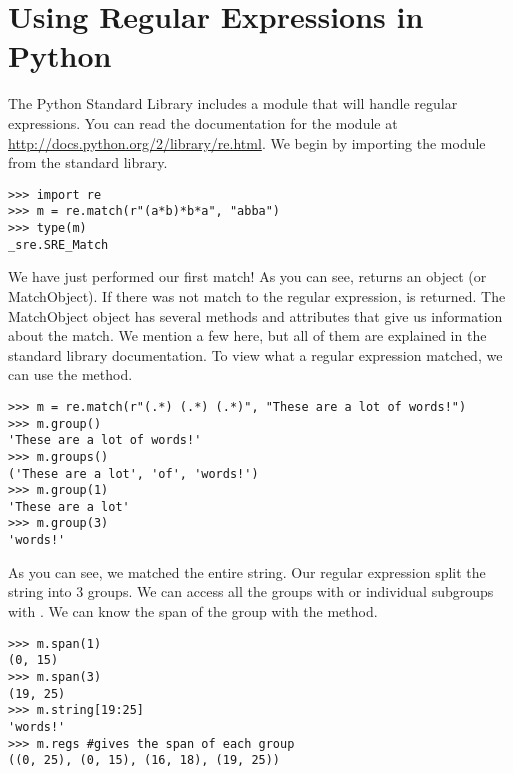 \section*{Using Regular Expressions in Python}
The Python Standard Library includes a module that will handle regular expressions.
You can read the documentation for the module at \url{http://docs.python.org/2/library/re.html}.
We begin by importing the  module from the standard library.
\begin{lstlisting}
>>> import re
>>> m = re.match(r"(a*b)*b*a", "abba")
>>> type(m)
_sre.SRE_Match
\end{lstlisting}
We have just performed our first match!  As you can see,  returns an  object (or MatchObject).
If there was not match to the regular expression,  is returned.
The MatchObject object has several methods and attributes that give us information about the match.
We mention a few here, but all of them are explained in the standard library documentation.
To view what a regular expression matched, we can use the  method.
\begin{lstlisting}
>>> m = re.match(r"(.*) (.*) (.*)", "These are a lot of words!")
>>> m.group()
'These are a lot of words!'
>>> m.groups()
('These are a lot', 'of', 'words!')
>>> m.group(1)
'These are a lot'
>>> m.group(3)
'words!'
\end{lstlisting}
As you can see, we matched the entire string.  Our regular expression split the string into 3 groups.
We can access all the groups with  or individual subgroups with .
We can know the span of the group with the  method.
\begin{lstlisting}
>>> m.span(1)
(0, 15)
>>> m.span(3)
(19, 25)
>>> m.string[19:25]
'words!'
>>> m.regs #gives the span of each group
((0, 25), (0, 15), (16, 18), (19, 25))
\end{lstlisting}

